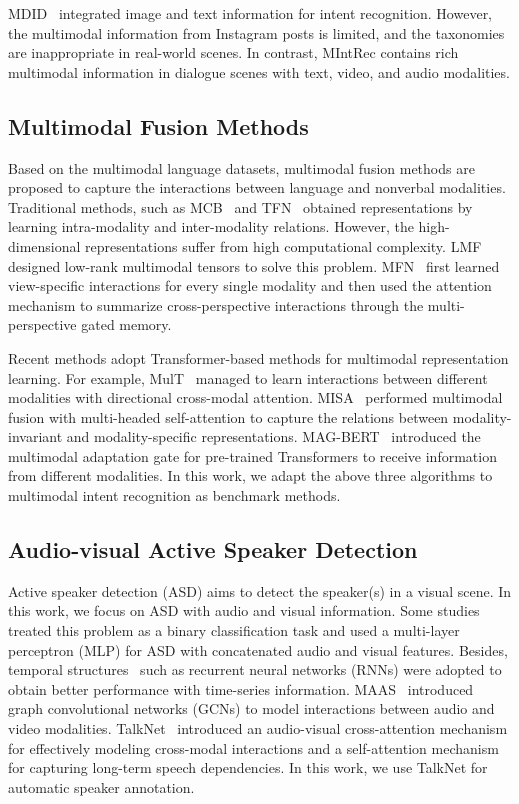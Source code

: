 \documentclass[sigconf,camera-ready]{acmart}
\begin{document}
MDID~\cite{kruk-etal-2019-integrating} integrated image and text information for intent recognition. However, the multimodal information from Instagram posts is limited, and the taxonomies are inappropriate in real-world scenes. In contrast, MIntRec contains rich multimodal information in dialogue scenes with text, video, and audio modalities. 

\subsection{Multimodal Fusion Methods}
Based on the multimodal language datasets,  multimodal fusion methods are proposed to capture the interactions between language and nonverbal modalities. Traditional methods, such as
MCB~\cite{fukui2016multimodal} and TFN~\cite{zadeh2017tensor}  obtained representations by learning intra-modality and inter-modality relations. However, the high-dimensional representations suffer from high computational complexity. 
LMF~\cite{LMF} designed low-rank multimodal tensors to solve this problem. MFN~\cite{MFN} first learned view-specific interactions for every single modality and then used the attention mechanism to summarize cross-perspective interactions through the multi-perspective gated memory. 

Recent methods adopt Transformer-based methods for multimodal representation learning. For example, MulT~\cite{tsai2019multimodal} managed to learn interactions between different modalities with directional cross-modal attention. MISA~\cite{hazarika2020misa} performed multimodal fusion with multi-headed self-attention to capture the relations between modality-invariant and modality-specific representations. MAG-BERT~\cite{BERT_MAG} introduced the multimodal adaptation gate for pre-trained Transformers to receive information from different modalities. In this work, we adapt the above three algorithms to multimodal intent recognition as benchmark methods. 

\subsection{Audio-visual Active Speaker Detection}
Active speaker detection (ASD) aims to detect the speaker(s) in a visual scene. In this work, we focus on ASD with audio and visual information. 
Some studies~\cite{chung2016out, afouras2020self} treated this problem as a binary classification task and used a multi-layer perceptron (MLP) for ASD with concatenated audio and visual features. Besides, temporal structures~\cite{tao2019end,roth2020ava} such as recurrent neural networks (RNNs) were adopted to obtain better performance with time-series information.  MAAS~\cite{alcazar2021maas} introduced graph convolutional networks (GCNs) to model interactions between audio and video modalities. TalkNet~\cite{tao2021someone} introduced an audio-visual cross-attention mechanism for effectively modeling cross-modal interactions and a self-attention mechanism for capturing long-term speech dependencies. In this work, we use TalkNet for automatic speaker annotation. 
\end{document}
